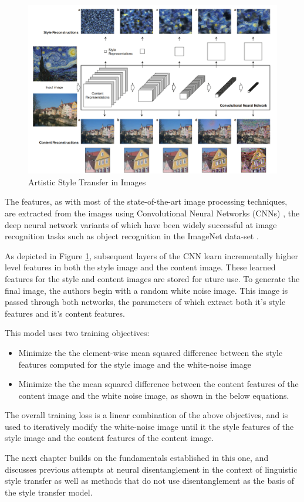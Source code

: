 \begin{figure}[ht]
	\centering
	\includegraphics[width=\textwidth]{images/image-style-transfer}
	\caption{\label{fig:image-style-transfer} Artistic Style Transfer in Images}
\end{figure}

The features, as with most of the state-of-the-art image processing techniques, are extracted from the images using Convolutional Neural Networks (CNNs) \citep{lecun1998gradient}, the deep neural network variants of which have been widely successful at image recognition tasks such as object recognition in the ImageNet data-set \cite{krizhevsky2012imagenet}.

As depicted in Figure \ref{fig:image-style-transfer}, subsequent layers of the CNN learn incrementally higher level features in both the style image and the content image. These learned features for the style and content images are stored for uture use. To generate the final image, the authors begin with a random white noise image. This image is passed through both networks, the parameters of which extract both it's style features and it's content features.

This model uses two training objectives:
\begin{itemize}
	\item Minimize the the element-wise mean squared difference between the style features computed for the style image and the white-noise image
	\item Minimize the the mean squared difference between the content features of the content image and the white noise image, as shown in the below equations.
\end{itemize}

The overall training loss is a linear combination of the above objectives, and is used to iteratively modify the white-noise image until it the style features of the style image and the content features of the content image.

The next chapter builds on the fundamentals established in this one, and discusses previous attempts at neural disentanglement in the context of linguistic style transfer as well as methods that do not use disentanglement as the basis of the style transfer model.
